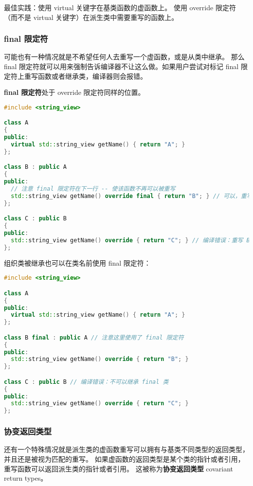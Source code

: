 \documentclass[../../LearnCpp.tex]{subfiles}
\begin{document}
最佳实践：使用 virtual 关键字在基类函数的虚函数上。
使用 override 限定符（而不是 virtual 关键字）在派生类中需要重写的函数上。

\subsubsection*{final 限定符}

可能也有一种情况就是不希望任何人去重写一个虚函数，或是从类中继承。
那么 final 限定符就可以用来强制告诉编译器不让这么做。如果用户尝试对标记 final 限定符上重写函数或者继承类，编译器则会报错。

\textbf{final 限定符}处于 override 限定符同样的位置。

\begin{lstlisting}[language=C++]
#include <string_view>

class A
{
public:
  virtual std::string_view getName() { return "A"; }
};

class B : public A
{
public:
  // 注意 final 限定符在下一行 -- 使该函数不再可以被重写
  std::string_view getName() override final { return "B"; } // 可以，重写 A::getName()
};

class C : public B
{
public:
  std::string_view getName() override { return "C"; } // 编译错误：重写 B::getName()，其为 final
};
\end{lstlisting}

组织类被继承也可以在类名前使用 final 限定符：

\begin{lstlisting}[language=C++]
#include <string_view>

class A
{
public:
  virtual std::string_view getName() { return "A"; }
};

class B final : public A // 注意这里使用了 final 限定符
{
public:
  std::string_view getName() override { return "B"; }
};

class C : public B // 编译错误：不可以继承 final 类
{
public:
  std::string_view getName() override { return "C"; }
};
\end{lstlisting}

\subsubsection*{协变返回类型}

还有一个特殊情况就是派生类的虚函数重写可以拥有与基类不同类型的返回类型，并且还是被视为匹配的重写。
如果虚函数的返回类型是某个类的指针或者引用，重写函数可以返回派生类的指针或者引用。
这被称为\textbf{协变返回类型} covariant return types。
\end{document}

